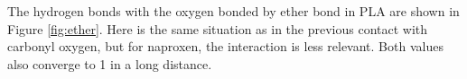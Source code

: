 The hydrogen bonds with the oxygen bonded by ether bond in PLA are shown in Figure \ref{fig:ether}. Here is the same situation as in the previous contact with carbonyl oxygen, but for naproxen, the interaction is less relevant. Both values also converge to 1 in a long distance.

\vspace{-0.5cm}
\begin{figure}[H]
	\centering
	\\
	\vspace{-0.2cm}
	\\

\end{figure}
